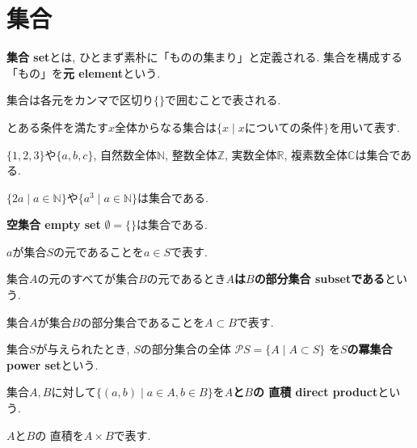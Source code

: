 \section{集合}
{\bf 集合 set}とは, ひとまず素朴に「ものの集まり」と定義される. 集合を構成する「もの」を{\bf 元 element}という.
\begin{Notation}
集合は各元をカンマで区切り$\{\}$で囲むことで表される. 
\end{Notation}
\begin{Notation}
とある条件を満たす$x$全体からなる集合は$\{x\mid x\text{についての条件}\}$を用いて表す.
\end{Notation}
\begin{example}$\{1,2,3\}$や$\{a,b,c\}$, 自然数全体$\mathbb{N}$, 整数全体$\mathbb{Z}$, 実数全体$\mathbb{R}$, 複素数全体$\mathbb{C}$は集合である.
\end{example}
\begin{example}
$\{2a\mid a\in\mathbb{N}\}$や$\{a^3\mid a\in\mathbb{N}\}$は集合である.
\end{example}
\begin{example}
{\bf 空集合 empty set} $\emptyset=\{\}$は集合である.
\end{example}
\begin{Notation}
$a$が集合$S$の元であることを$a\in S$で表す.
\end{Notation}
\begin{Def}
集合$A$の元のすべてが集合$B$の元であるとき{\bf $A$は$B$の部分集合 subsetである}という.  
\end{Def}
\begin{Notation}
集合$A$が集合$B$の部分集合であることを$A\subset B$で表す.
\end{Notation}
\begin{Def}
集合$S$が与えられたとき, $S$の部分集合の全体
$\mathscr{P}S=\{A\mid A\subset S\}$
を{\bf $S$の冪集合 power set}という.
\end{Def}

\begin{Def}
集合$A,B$に対して$\{(a,b)\mid a\in A, b\in B\}$を{\bf $A$と$B$の
直積 direct product}という.
\end{Def}
\begin{Notation}
$A$と$B$の
直積を$A\times B$で表す.
\end{Notation}
\begin{comment}
実は, 集合を「ものの集まり」と素朴に定義することは, 矛盾を孕んでいる. この矛盾を避けるための議論はのちに行う. 
また, 集合論の公理には立ち入らないこととする.
\end{comment}
